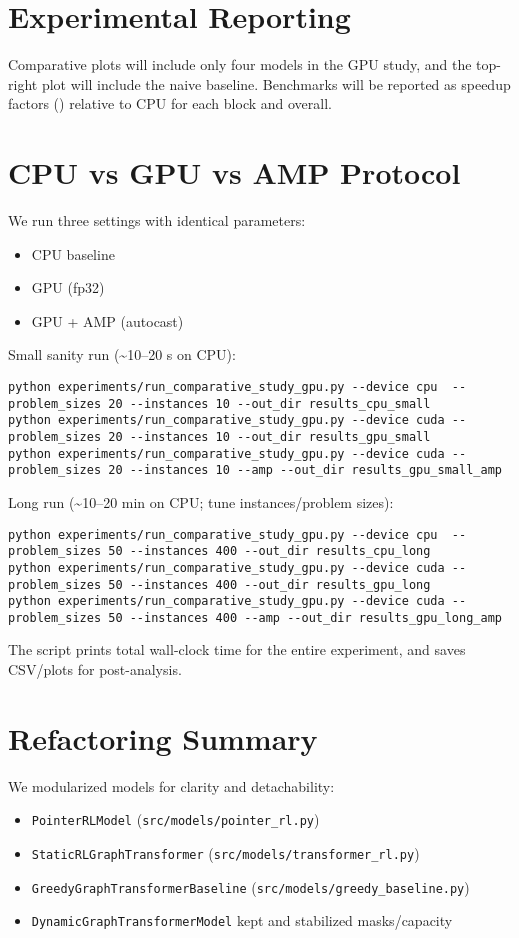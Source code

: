 \documentclass[11pt]{article}
\begin{document}
\section{Experimental Reporting}
Comparative plots will include only four models in the GPU study, and the top-right plot will include the naive baseline. Benchmarks will be reported as speedup factors (\si{\times}) relative to CPU for each block and overall.

\section{CPU vs GPU vs AMP Protocol}
We run three settings with identical parameters:
\begin{itemize}[noitemsep]
  \item CPU baseline
  \item GPU (fp32)
  \item GPU + AMP (autocast)
\end{itemize}

Small sanity run (\textasciitilde10--20 s on CPU):
\begin{verbatim}
python experiments/run_comparative_study_gpu.py --device cpu  --problem_sizes 20 --instances 10 --out_dir results_cpu_small
python experiments/run_comparative_study_gpu.py --device cuda --problem_sizes 20 --instances 10 --out_dir results_gpu_small
python experiments/run_comparative_study_gpu.py --device cuda --problem_sizes 20 --instances 10 --amp --out_dir results_gpu_small_amp
\end{verbatim}

Long run (\textasciitilde10--20 min on CPU; tune instances/problem sizes):
\begin{verbatim}
python experiments/run_comparative_study_gpu.py --device cpu  --problem_sizes 50 --instances 400 --out_dir results_cpu_long
python experiments/run_comparative_study_gpu.py --device cuda --problem_sizes 50 --instances 400 --out_dir results_gpu_long
python experiments/run_comparative_study_gpu.py --device cuda --problem_sizes 50 --instances 400 --amp --out_dir results_gpu_long_amp
\end{verbatim}

The script prints total wall-clock time for the entire experiment, and saves CSV/plots for post-analysis.

\section{Refactoring Summary}
We modularized models for clarity and detachability:
\begin{itemize}[noitemsep]
  \item \texttt{PointerRLModel} (\texttt{src/models/pointer\_rl.py})
  \item \texttt{StaticRLGraphTransformer} (\texttt{src/models/transformer\_rl.py})
  \item \texttt{GreedyGraphTransformerBaseline} (\texttt{src/models/greedy\_baseline.py})
  \item \texttt{DynamicGraphTransformerModel} kept and stabilized masks/capacity
\end{itemize}
\end{document}
